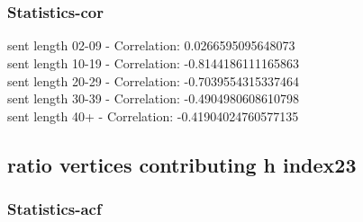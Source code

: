 \documentclass{article}%
\begin{document}
\begin{figure}[ht]%
\centering%
\setlength{\abovecaptionskip}{-35pt}%
%
%
\\%
%
%
\\%
%
\end{figure}

%
\newpage%
\subsubsection{Statistics{-}cor}%
\label{ssubsec:Statistics{-}cor}%
\noindent%
sent length 02-09 - Correlation: 0.0266595095648073\\%
sent length 10-19 - Correlation: -0.8144186111165863\\%
sent length 20-29 - Correlation: -0.7039554315337464\\%
sent length 30-39 - Correlation: -0.4904980608610798\\%
sent length 40+ - Correlation: -0.41904024760577135\\

%
\newpage

%
\subsection{ratio vertices contributing h index23}%
\label{subsec:ratioverticescontributinghindex23}%
\subsubsection{Statistics{-}acf}%
\label{ssubsec:Statistics{-}acf}%
\end{document}
